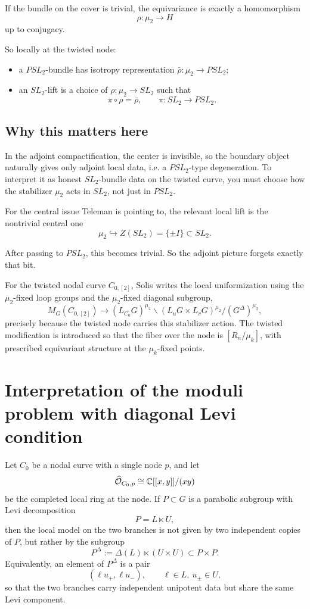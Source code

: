 \documentclass[12pt]{article}
\begin{document}
If the bundle on the cover is trivial, the equivariance is exactly a homomorphism
\[
\rho: \mu_2 \to H
\]
up to conjugacy.

So locally at the twisted node:
\begin{itemize}
    \item a $PSL_2$-bundle has isotropy representation $\bar{\rho}: \mu_2 \to PSL_2$;
    \item an $SL_2$-lift is a choice of $\rho: \mu_2 \to SL_2$ such that
    \[
    \pi \circ \rho = \bar{\rho}, \qquad \pi: SL_2 \to PSL_2.
    \]
\end{itemize}


\subsection{Why this matters here}

In the adjoint compactification, the center is invisible, so the boundary object naturally gives only adjoint local data, i.e. a $PSL_2$-type degeneration. To interpret it as honest $SL_2$-bundle data on the twisted curve, you must choose how the stabilizer $\mu_2$ acts in $SL_2$, not just in $PSL_2$.

For the central issue Teleman is pointing to, the relevant local lift is the nontrivial central one
\[
\mu_2 \hookrightarrow Z(SL_2) = \{\pm I\} \subset SL_2.
\]

After passing to $PSL_2$, this becomes trivial. So the adjoint picture forgets exactly that bit.

For the twisted nodal curve $C_{0,[2]}$, Solis writes the local uniformization using the $\mu_2$-fixed loop groups and the $\mu_2$-fixed diagonal subgroup,
\[
M_G(C_{0,[2]}) \to (L_{C_0}G)^{\mu_2} \backslash (L_uG \times L_vG)^{\mu_2} / (G^\Delta)^{\mu_2},
\]
precisely because the twisted node carries this stabilizer action. The twisted modification is introduced so that the fiber over the node is $[R_n/\mu_k]$, with prescribed equivariant structure at the $\mu_k$-fixed points.

\section{Interpretation of the moduli problem with diagonal Levi condition}
Let $C_0$ be a nodal curve with a single node $p$, and let
\[
\widehat{\mathcal O}_{C_0,p}\cong \mathbb{C}[[x,y]]/(xy)
\]
be the completed local ring at the node. If $P\subset G$ is a parabolic subgroup with Levi decomposition
\[
P=L\ltimes U,
\]
then the local model on the two branches is not given by two independent copies of $P$, but rather by the subgroup
\[
P^\Delta:=\Delta(L)\ltimes (U\times U)\subset P\times P.
\]
Equivalently, an element of $P^\Delta$ is a pair
\[
(\ell u_+,\ell u_-),\qquad \ell\in L,\ u_\pm\in U,
\]
so that the two branches carry independent unipotent data but share the same Levi component.
\end{document}
